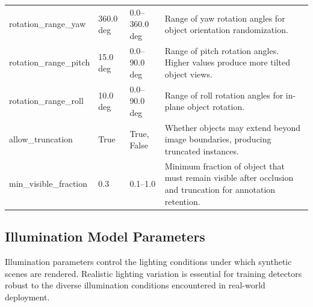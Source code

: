 \begin{longtable}{p{3.5cm}p{2cm}p{2.5cm}p{5.5cm}}
rotation\_range\_yaw & 360.0 deg & 0.0--360.0 deg & Range of yaw rotation angles for object orientation randomization. \\
\addlinespace
rotation\_range\_pitch & 15.0 deg & 0.0--90.0 deg & Range of pitch rotation angles. Higher values produce more tilted object views. \\
\addlinespace
rotation\_range\_roll & 10.0 deg & 0.0--90.0 deg & Range of roll rotation angles for in-plane object rotation. \\
\addlinespace
allow\_truncation & True & True, False & Whether objects may extend beyond image boundaries, producing truncated instances. \\
\addlinespace
min\_visible\_fraction & 0.3 & 0.1--1.0 & Minimum fraction of object that must remain visible after occlusion and truncation for annotation retention. \\
\end{longtable}

\subsection{Illumination Model Parameters}

Illumination parameters control the lighting conditions under which synthetic scenes are rendered. Realistic lighting variation is essential for training detectors robust to the diverse illumination conditions encountered in real-world deployment.

